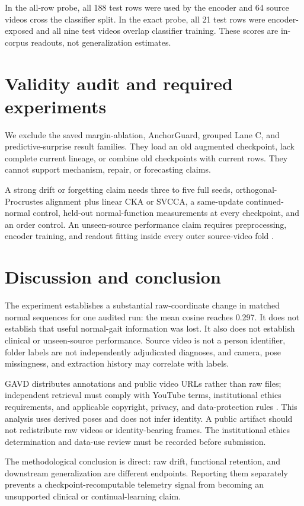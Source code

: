 \documentclass[10pt,twocolumn]{article}
\begin{document}
In the all-row probe, all 188 test rows were used by the encoder and 64 source videos cross the classifier split. In the exact probe, all 21 test rows were encoder-exposed and all nine test videos overlap classifier training. These scores are in-corpus readouts, not generalization estimates.

\section{Validity audit and required experiments}
We exclude the saved margin-ablation, AnchorGuard, grouped Lane C, and predictive-surprise result families. They load an old augmented checkpoint, lack complete current lineage, or combine old checkpoints with current rows. They cannot support mechanism, repair, or forecasting claims.

A strong drift or forgetting claim needs three to five full seeds, orthogonal-Procrustes alignment plus linear CKA or SVCCA, a same-update continued-normal control, held-out normal-function measurements at every checkpoint, and an order control. An unseen-source performance claim requires preprocessing, encoder training, and readout fitting inside every outer source-video fold \cite{roberts2017crossvalidation}.

\section{Discussion and conclusion}
The experiment establishes a substantial raw-coordinate change in matched normal sequences for one audited run: the mean cosine reaches 0.297. It does not establish that useful normal-gait information was lost. It also does not establish clinical or unseen-source performance. Source video is not a person identifier, folder labels are not independently adjudicated diagnoses, and camera, pose missingness, and extraction history may correlate with labels.

GAVD distributes annotations and public video URLs rather than raw files; independent retrieval must comply with YouTube terms, institutional ethics requirements, and applicable copyright, privacy, and data-protection rules \cite{gavdRepo2026}. This analysis uses derived poses and does not infer identity. A public artifact should not redistribute raw videos or identity-bearing frames. The institutional ethics determination and data-use review must be recorded before submission.

The methodological conclusion is direct: raw drift, functional retention, and downstream generalization are different endpoints. Reporting them separately prevents a checkpoint-recomputable telemetry signal from becoming an unsupported clinical or continual-learning claim.



\end{document}
